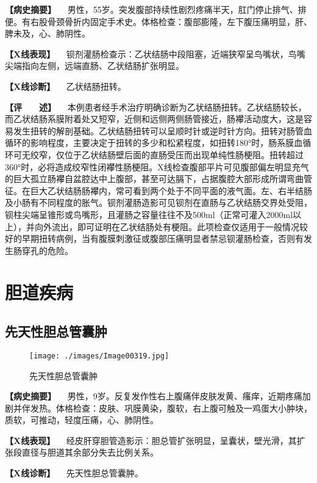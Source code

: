 \textbf{【病史摘要】}
　男性，55岁。突发腹部持续性剧烈疼痛半天，肛门停止排气、排便。有右股骨颈骨折内固定手术史。体格检查：腹部膨隆，左下腹压痛明显，肝、脾未及，心、肺阴性。

\textbf{【X线表现】}
　钡剂灌肠检查示：乙状结肠中段阻塞，近端狭窄呈鸟嘴状，鸟嘴尖端指向左侧，远端直肠、乙状结肠扩张明显。

\textbf{【X线诊断】} 　乙状结肠扭转。

\textbf{【评　　述】}
　本例患者经手术治疗明确诊断为乙状结肠扭转。乙状结肠较长，而乙状结肠系膜附着处又短窄，近侧和远侧两侧肠管接近，肠襻活动度大，这是容易发生扭转的解剖基础。乙状结肠扭转可以呈顺时针或逆时针方向。扭转对肠管血循环的影响程度，主要决定于扭转的多少和松紧程度，如扭转180°时，肠系膜血循环可无绞窄，仅位于乙状结肠壁后面的直肠受压而出现单纯性肠梗阻。扭转超过360°时，必将造成绞窄性闭襻性肠梗阻。X线检查腹部平片可见腹部偏左明显充气的巨大孤立肠襻自盆腔达中上腹部，甚至可达膈下，占据腹腔大部形成所谓弯曲管征。在巨大乙状结肠肠襻内，常可看到两个处于不同平面的液气面。左、右半结肠及小肠有不同程度的胀气。钡剂灌肠造影可见钡剂在直肠与乙状结肠交界处受阻，钡柱尖端呈锥形或鸟嘴形，且灌肠之容量往往不及500ml（正常可灌入2000ml以上），并向外流出，即可证明在乙状结肠处有梗阻。此项检查仅适用于一般情况较好的早期扭转病例，当有腹膜刺激征或腹部压痛明显者禁忌钡灌肠检查，否则有发生肠穿孔的危险。

\section{胆道疾病}

\subsection{先天性胆总管囊肿}

\begin{figure}[!htbp]
 \centering
 \texttt{[image: ./images/Image00319.jpg]}
 \captionsetup{justification=centering}
 \caption{先天性胆总管囊肿}
 \label{fig5-8-1}
  \end{figure} 

\textbf{【病史摘要】}
　男性，9岁。反复发作性右上腹痛伴皮肤发黄、瘙痒，近期疼痛加剧并伴发热。体格检查：皮肤、巩膜黄染，腹软，右上腹可触及一鸡蛋大小肿块，质软，可推动，轻度压痛，心、肺阴性。

\textbf{【X线表现】}
　经皮肝穿胆管造影示：胆总管扩张明显，呈囊状，壁光滑，其扩张段直径与胆道其余部分失去比例关系。

\textbf{【X线诊断】} 　先天性胆总管囊肿。

